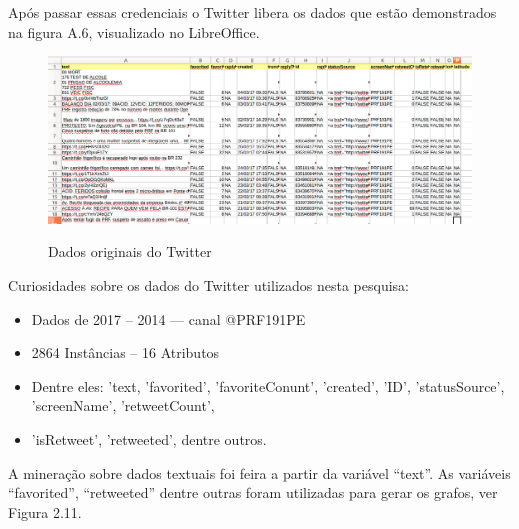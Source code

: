 Após passar essas credenciais o Twitter libera os dados que estão demonstrados na figura A.6, visualizado no LibreOffice.

\begin{figure}[ht!]
	\centering
	\caption{Dados originais do Twitter}
	\includegraphics[width=0.9\linewidth]{Figuras/Anexos/tweetPRF}
	\label{fig:workflow Twitter}
\end{figure}

Curiosidades sobre os dados do Twitter utilizados nesta pesquisa:
\begin{itemize}
	\item Dados de 2017 -- 2014 --- canal @PRF191PE
	\item 2864 Instâncias -- 16 Atributos
	\item Dentre eles: 'text, 'favorited', 'favoriteConunt', 'created', 'ID', 'statusSource', 'screenName', 'retweetCount',
	\item 'isRetweet', 'retweeted', dentre outros.		
\end{itemize}

A mineração sobre dados textuais foi feira a partir da variável ``text''. As variáveis ``favorited'', ``retweeted'' dentre outras foram utilizadas para gerar os grafos, ver Figura 2.11.